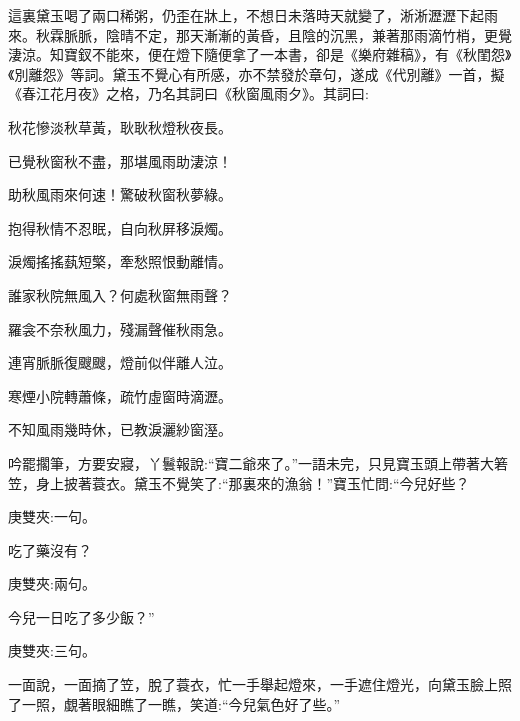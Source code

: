\begin{parag}
    這裏黛玉喝了兩口稀粥，仍歪在牀上，不想日未落時天就變了，淅淅瀝瀝下起雨來。秋霖脈脈，陰晴不定，那天漸漸的黃昏，且陰的沉黑，兼著那雨滴竹梢，更覺淒涼。知寶釵不能來，便在燈下隨便拿了一本書，卻是《樂府雜稿》，有《秋閨怨》《別離怨》等詞。黛玉不覺心有所感，亦不禁發於章句，遂成《代別離》一首，擬《春江花月夜》之格，乃名其詞曰《秋窗風雨夕》。其詞曰:
\end{parag}


\begin{poem}
    \begin{pl}秋花慘淡秋草黃，耿耿秋燈秋夜長。\end{pl}

    \begin{pl}已覺秋窗秋不盡，那堪風雨助淒涼！\end{pl}

    \begin{pl}助秋風雨來何速！驚破秋窗秋夢綠。\end{pl}

    \begin{pl}抱得秋情不忍眠，自向秋屏移淚燭。\end{pl}

    \begin{pl}淚燭搖搖蓺短檠，牽愁照恨動離情。\end{pl}

    \begin{pl}誰家秋院無風入？何處秋窗無雨聲？\end{pl}

    \begin{pl}羅衾不奈秋風力，殘漏聲催秋雨急。\end{pl}

    \begin{pl}連宵脈脈復颼颼，燈前似伴離人泣。\end{pl}

    \begin{pl}寒煙小院轉蕭條，疏竹虛窗時滴瀝。\end{pl}

    \begin{pl}不知風雨幾時休，已教淚灑紗窗溼。\end{pl}

\end{poem}


\begin{parag}
    吟罷擱筆，方要安寢，丫鬟報說:“寶二爺來了。”一語未完，只見寶玉頭上帶著大箬笠，身上披著蓑衣。黛玉不覺笑了:“那裏來的漁翁！”寶玉忙問:“今兒好些？\begin{note}庚雙夾:一句。\end{note}吃了藥沒有？\begin{note}庚雙夾:兩句。\end{note}今兒一日吃了多少飯？”\begin{note}庚雙夾:三句。\end{note}一面說，一面摘了笠，脫了蓑衣，忙一手舉起燈來，一手遮住燈光，向黛玉臉上照了一照，覷著眼細瞧了一瞧，笑道:“今兒氣色好了些。”
\end{parag}


